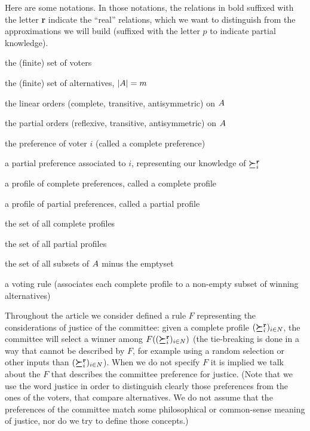 \documentclass[version=last, pagesize, twoside=off, bibliography=totoc, DIV=calc, fontsize=14pt, a4paper, french, english]{scrartcl}
\begin{document}
Here are some notations. In those notations, the relations in bold suffixed with the letter \textbf{r} indicate the “real” relations, which we want to distinguish from the approximations we will build (suffixed with the letter $p$ to indicate partial knowledge).
\begin{description}[font=\normalfont, leftmargin=!, labelwidth=\widthof{$F: \allprofs \rightarrow \powersetz{\alts}$}]
	\item[$N$] the (finite) set of voters
	\item[$\alts$] the (finite) set of alternatives, $\lvert{A}\rvert = m$
	\item[$\linors \subseteq \powerset{\alts × \alts}$] the linear orders (complete, transitive, antisymmetric) on $\alts$
	\item[$\pors \subseteq \powerset{\alts × \alts}$] the partial orders (reflexive, transitive, antisymmetric) on $\alts$
	\item[$\pref_i \in \linors$] the preference of voter $i$ (called a complete preference)
	\item[$\ppref_i \in \pors$] a partial preference associated to $i$, representing our knowledge of $\boldsymbol{\succeq}^\textbf{r}_i$
	\item[$\prof = \profshort$] a profile of complete preferences, called a complete profile
	\item[$\pprof = \pprofshort$] a profile of partial preferences, called a partial profile
	\item[$\allprofs$] the set of all complete profiles
	\item[$\allpprofs$] the set of all partial profiles
	\item[$\powersetz{\alts}$] the set of all subsets of $\alts$ minus the emptyset
	\item[$F: \allprofs \rightarrow \powersetz{\alts}$] a voting rule (associates each complete profile to a non-empty subset of winning alternatives)
\end{description}

Throughout the article we consider defined a rule $F$ representing the considerations of justice of the committee: given a complete profile $(\boldsymbol{\succeq}^\textbf{r}_i)_{i \in N}$, the committee will select a winner among $F((\boldsymbol{\succeq}^\textbf{r}_i)_{i \in N})$ (the tie-breaking is done in a way that cannot be described by $F$, for example using a random selection or other inputs than $(\boldsymbol{\succeq}^\textbf{r}_i)_{i \in N}$). When we do not specify $F$ it is implied we talk about the $F$ that describes the committee preference for justice. (Note that we use the word justice in order to distinguish clearly those preferences from the ones of the voters, that compare alternatives. We do not assume that the preferences of the committee match some philosophical or common-sense meaning of justice, nor do we try to define those concepts.)
\end{document}
